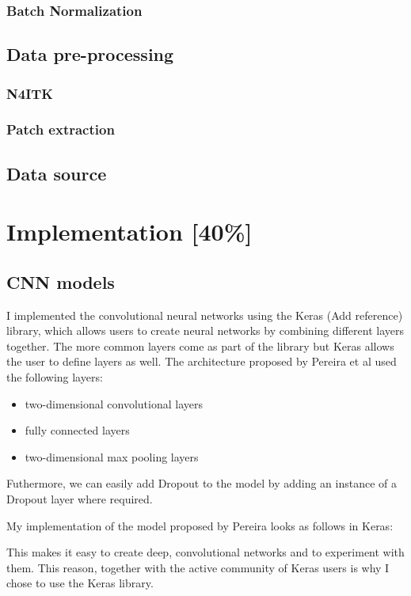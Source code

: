 \documentclass[12pt,a4paper,twoside,openright]{report}
\begin{document}
\subsection{Batch Normalization}

\section{Data pre-processing}
\subsection{N4ITK}
\subsection{Patch extraction}

\section{Data source}

\chapter{Implementation [40\%]}
\section{CNN models}
I implemented the convolutional neural networks using the Keras (Add reference) library, which allows users to create neural networks by combining different layers together. The more common layers come as part of the library but Keras allows the user to define layers as well.  The architecture proposed by Pereira et al \cite{pereira} used the following layers:
\begin{itemize}
	\item two-dimensional convolutional layers
	\item fully connected layers
	\item two-dimensional max pooling layers
\end{itemize}
Futhermore, we can easily add Dropout to the model by adding an instance of a Dropout layer where required. 

My implementation of the model proposed by Pereira \cite{pereira} looks as follows in Keras:


This makes it easy to create deep, convolutional networks and to experiment with them. This reason, together with the active community of Keras users is why I chose to use the Keras library.
\end{document}
